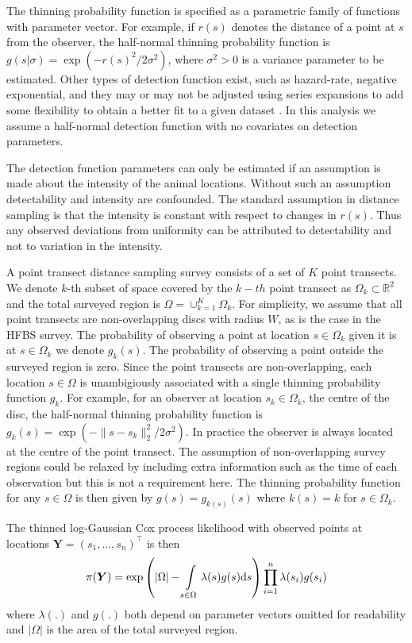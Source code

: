 \documentclass[preprint,12pt]{elsarticle}
\newcommand{\bm}{\boldsymbol}  %
\begin{document}
The thinning probability function is specified as a parametric family of functions with parameter vector.  For example, if $r(s)$ denotes the distance of a point at $s$ from the observer, the half-normal thinning probability function is $g(s | \sigma) = \exp(-r(s)^2 / 2\sigma^2)$, where $\sigma^2 > 0$ is a variance parameter to be estimated.  Other types of detection function exist, such as hazard-rate, negative exponential, and they may or may not be adjusted using series expansions to add some flexibility to obtain a better fit to a given dataset \citep{buckland_distance_2015}.  In this analysis we assume a half-normal detection function with no covariates on detection parameters.

The detection function parameters can only be estimated if an assumption is made about the intensity of the animal locations.  Without such an assumption detectability and intensity are confounded.  The standard assumption in distance sampling is that the intensity is constant with respect to changes in $r(s)$.  Thus any observed deviations from uniformity can be attributed to detectability and not to variation in the intensity.

A point transect distance sampling survey consists of a set of $K$ point transects.   We denote $k$-th subset of space covered by the $k-th$ point transect as $\Omega_k \subset \mathbb{R}^2$ and the total surveyed region is $\Omega = \cup_{k=1}^K \Omega_k$.  For simplicity, we assume that all point transects are non-overlapping discs with radius $W$, as is the case in the HFBS survey.  The probability of observing a point at location $s \in \Omega_k$ given it is at $s \in \Omega_k$ we denote $g_k(s)$.  The probability of observing a point outside the surveyed region is zero.
Since the point transects are non-overlapping, each location $s \in \Omega$ is unambigiously associated with a single thinning probability function $g_k$.  For example, for an observer at location $s_k \in \Omega_k$, the centre of the disc, the half-normal thinning probability function is $g_k(s) = \exp(-\lVert s - s_k \rVert_2^2 / 2\sigma^2)$.  In practice the observer is always located at the centre of the point transect.  The assumption of non-overlapping survey regions could be relaxed by including extra information such as the time of each observation but this is not a requirement here.  The thinning probability function for any $s \in \Omega$ is then given by $g(s) = g_{k(s)}(s)$ where $k(s) = k$ for $s \in \Omega_k$.

The thinned log-Gaussian Cox process likelihood with observed points at locations $\bm{Y} = (s_1, \ldots, s_n)^\intercal$ is then
\begin{equation}
\label{lgcp-likelihood}
\pi(\bm{Y}) = \exp\left( |\Omega| -\int\displaylimits_{s \in \Omega} \lambda(s) g(s) \mathrm{d}s \right)\prod_{i=1}^n \lambda(s_i)g(s_i)
\end{equation}
where $\lambda(.)$ and $g(.)$ both depend on parameter vectors omitted for readability and $|\Omega|$ is the area of the total surveyed region.  
\end{document}
